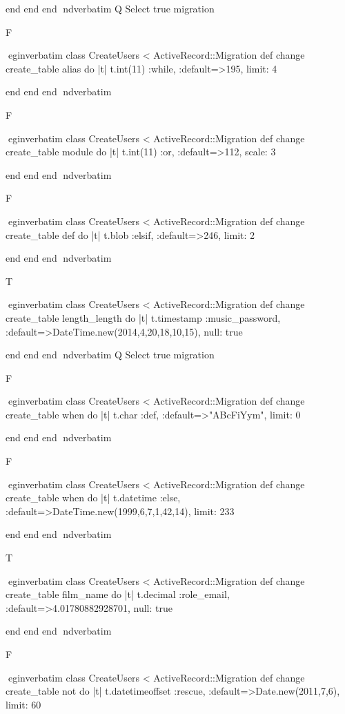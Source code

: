     end 
  end 
end
nd{verbatim}
Q
 Select true migration

F

egin{verbatim}
 class CreateUsers < ActiveRecord::Migration 
  def change 
    create_table alias do |t| 
      t.int(11) :while, :default=>195, limit: 4
    
    end 
  end 
end
nd{verbatim}

F

egin{verbatim}
 class CreateUsers < ActiveRecord::Migration 
  def change 
    create_table module do |t| 
      t.int(11) :or, :default=>112, scale: 3
    
    end 
  end 
end
nd{verbatim}

F

egin{verbatim}
 class CreateUsers < ActiveRecord::Migration 
  def change 
    create_table def do |t| 
      t.blob :elsif, :default=>246, limit: 2
    
    end 
  end 
end
nd{verbatim}

T

egin{verbatim}
 class CreateUsers < ActiveRecord::Migration 
  def change 
    create_table length_length do |t| 
      t.timestamp :music_password, :default=>DateTime.new(2014,4,20,18,10,15), null: true
    
    end 
  end 
end
nd{verbatim}
Q
 Select true migration

F

egin{verbatim}
 class CreateUsers < ActiveRecord::Migration 
  def change 
    create_table when do |t| 
      t.char :def, :default=>"ABcFiYym", limit: 0
    
    end 
  end 
end
nd{verbatim}

F

egin{verbatim}
 class CreateUsers < ActiveRecord::Migration 
  def change 
    create_table when do |t| 
      t.datetime :else, :default=>DateTime.new(1999,6,7,1,42,14), limit: 233
    
    end 
  end 
end
nd{verbatim}

T

egin{verbatim}
 class CreateUsers < ActiveRecord::Migration 
  def change 
    create_table film_name do |t| 
      t.decimal :role_email, :default=>4.01780882928701, null: true
    
    end 
  end 
end
nd{verbatim}

F

egin{verbatim}
 class CreateUsers < ActiveRecord::Migration 
  def change 
    create_table not do |t| 
      t.datetimeoffset :rescue, :default=>Date.new(2011,7,6), limit: 60
    
